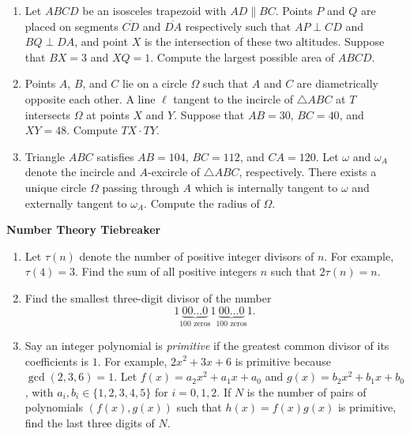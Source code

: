 \documentclass[10pt]{article}
\newcounter{enum}
\begin{document}
\begin{enumerate}

\item Let $ABCD$ be an isosceles trapezoid with $AD\parallel BC$.  Points $P$ and $Q$ are placed on segments $\overline{CD}$ and $\overline{DA}$ respectively such that $AP\perp CD$ and $BQ\perp DA$, and point $X$ is the intersection of these two altitudes.  Suppose that $BX=3$ and $XQ=1$.  Compute the largest possible area of $ABCD$.

\item Points $A$, $B$, and $C$ lie on a circle $\Omega$ such that $A$ and $C$ are diametrically opposite each other.  A line $\ell$ tangent to the incircle of $\triangle ABC$ at $T$ intersects $\Omega$ at points $X$ and $Y$.  Suppose that $AB=30$, $BC=40$, and $XY=48$.  Compute $TX\cdot TY$.

\item Triangle $ABC$ satisfies $AB=104$, $BC=112$, and $CA=120$.  Let $\omega$ and $\omega_A$ denote the incircle and $A$-excircle of $\triangle ABC$, respectively.  There exists a unique circle $\Omega$ passing through $A$ which is internally tangent to $\omega$ and externally tangent to $\omega_A$.  Compute the radius of $\Omega$.

\end{enumerate}

\newpage

\begin{center}
\huge\textbf{Number Theory Tiebreaker}
\end{center}

\begin{enumerate}
	\item Let $\tau(n)$ denote the number of positive integer divisors of $n$. For example, $\tau(4) = 3$. Find the sum of all positive integers $n$ such that $2 \tau(n) = n$.
	
	\item Find the smallest three-digit divisor of the number \[1\underbrace{00\ldots 0}_{100\text{ zeros}}1\underbrace{00\ldots 0}_{100\text{ zeros}}1.\]
	
	\item Say an integer polynomial is \textit{primitive} if the greatest common divisor of its coefficients is $1$.  For example, $2x^2+3x+6$ is primitive because $\gcd(2,3,6)=1$.  Let $f(x)=a_2x^2+a_1x+a_0$ and $g(x) = b_2x^2+b_1x+b_0$, with $a_i,b_i\in\{1,2,3,4,5\}$ for $i=0,1,2$.  If $N$ is the number of pairs of polynomials $(f(x),g(x))$ such that $h(x) = f(x)g(x)$ is primitive, find the last three digits of $N$.
	
\end{enumerate}
\end{document}
